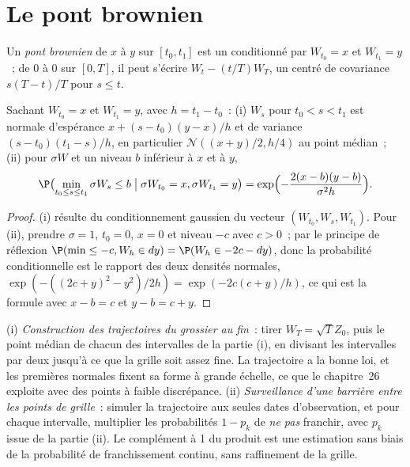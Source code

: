 \section{Le pont brownien}\label{sec:qm:brownian-motion:bridge}

\begin{definition}\label{def:qm:brownian-motion:bridge}
Un \emph{pont brownien} de $x$ à $y$ sur $[t_0, t_1]$ est un 
conditionné par $W_{t_0} = x$ et $W_{t_1} = y$~; de $0$ à $0$ sur $[0, T]$, il peut s'écrire
$W_t - (t/T)W_T$, un  centré de covariance $s(T - t)/T$ pour $s \le t$.
\end{definition}

\begin{proposition}\label{prop:qm:brownian-motion:between}
Sachant $W_{t_0} = x$ et $W_{t_1} = y$, avec $h = t_1 - t_0$~: (i) $W_s$ pour $t_0 < s < t_1$ est
normale d'espérance $x + (s - t_0)(y - x)/h$ et de variance $(s - t_0)(t_1 - s)/h$, en particulier
$\mathcal N((x+y)/2, h/4)$ au point médian~; (ii) pour $\sigma W$ et un niveau $b$ inférieur à $x$
et à $y$,
\[
\P\bigl(\min_{t_0 \le s \le t_1}\sigma W_s \le b \bigm| \sigma W_{t_0} = x, \sigma W_{t_1} = y\bigr) =
\exp\Bigl(-\frac{2(x - b)(y - b)}{\sigma^2 h}\Bigr).
\]
\end{proposition}

\begin{proof}
(i) résulte du conditionnement gaussien du vecteur $(W_{t_0}, W_s, W_{t_1})$. Pour (ii), prendre $\sigma = 1$,
$t_0 = 0$, $x = 0$ et niveau $-c$ avec $c > 0$~; par le principe de réflexion $\P(\min \le -c, W_h
\in dy) = \P(W_h \in -2c - dy)$, donc la probabilité conditionnelle est le rapport des deux densités
normales, $\exp(-((2c + y)^2 - y^2)/2h) = \exp(-2c(c + y)/h)$, ce qui est la formule avec $x - b
= c$ et $y - b = c + y$.
\end{proof}

\begin{method}\label{met:qm:brownian-motion:bridge}
(i) \emph{Construction des trajectoires du grossier au fin}~: tirer $W_T = \sqrt T Z_0$, puis le point médian de chacun des
intervalles de la partie (i), en divisant les intervalles par deux jusqu'à ce que la grille soit assez fine. La trajectoire a la
bonne loi, et les premières normales fixent sa forme à grande échelle, ce que le chapitre~26 exploite avec
des points à faible discrépance. (ii) \emph{Surveillance d'une barrière entre les points de grille}~: simuler la trajectoire
aux seules dates d'observation, et pour chaque intervalle, multiplier les probabilités $1 - p_k$ de
\emph{ne pas} franchir, avec $p_k$ issue de la partie (ii). Le complément à 1 du produit est une estimation sans biais de
la probabilité de franchissement continu, sans raffinement de la grille.
\end{method}


